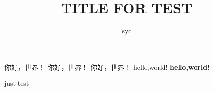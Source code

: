 \documentclass[a4paper, 12pt, fontset=windows, draft]{ctexbook}
\title{TITLE FOR TEST}
\author{syc}
\begin{document}

你好，世界！
你好，世界！
\clearpage
你好，世界！
hello,world!
\bf
hello,world!

just test
\end{document}
